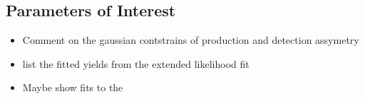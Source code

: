 \subsection{Parameters of Interest}
\label{Parameters_of_Interest}



\begin{itemize}
\item Comment on the gaussian contstrains of production and detection assymetry
\item list the fitted yields from the extended likelihood fit
\item Maybe show fits to the \BdJpsiKst
\end{itemize}

